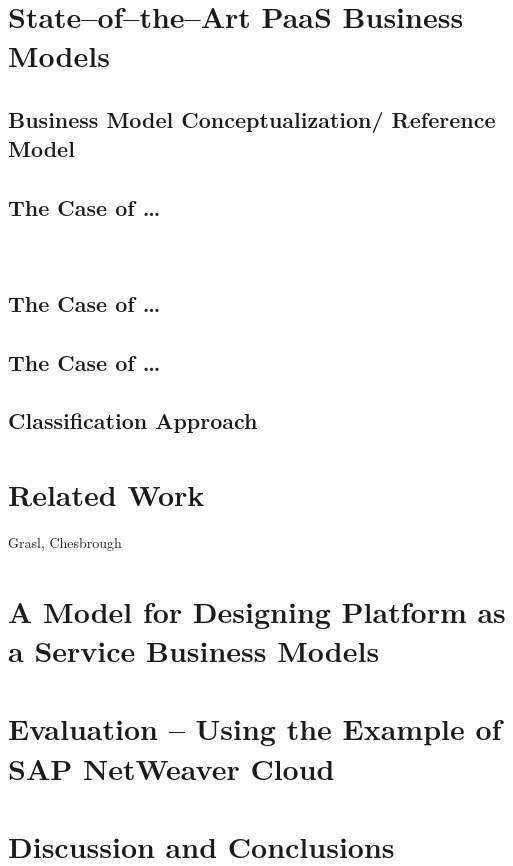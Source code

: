 	\citep{Johnson2008}

\chapter{State--of--the--Art PaaS Business Models}

	\section{Business Model Conceptualization/ Reference Model}
	
	\section{The Case of \ldots}
		\lipsum ~\\
		
	\section{The Case of \ldots}
	\section{The Case of \ldots}
	
	\section{Classification Approach}
	
	\lipsum

\chapter{Related Work}
Grasl, Chesbrough


\chapter{A Model for Designing Platform as a Service Business Models}

\chapter{Evaluation -- Using the Example of SAP NetWeaver Cloud}

\chapter{Discussion and Conclusions}



